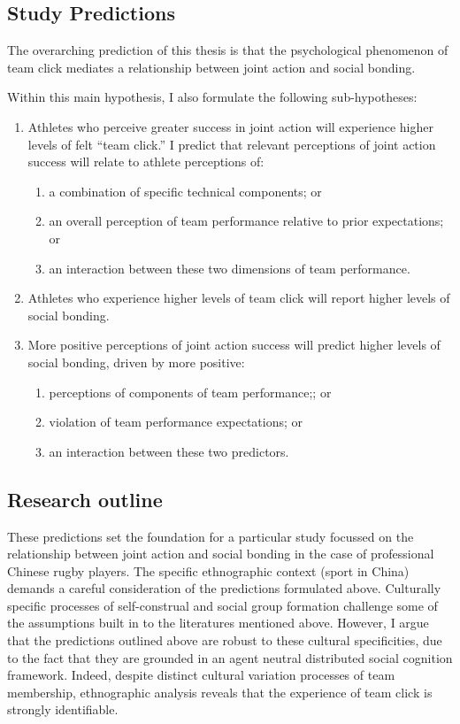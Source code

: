 \begin{CJK}{UTF8}{gbsn}
\subsection{Study Predictions}


    The overarching prediction of this thesis is that the psychological phenomenon of team click mediates a relationship between joint action and social bonding.

    Within this main hypothesis, I also formulate the following sub-hypotheses:
    \begin{enumerate}
      \item Athletes who perceive greater success in joint action will experience higher levels of felt ``team click.'' I predict that relevant perceptions of joint action success will relate to athlete perceptions of:
        \begin{enumerate}
          \item a combination of specific technical components; or
          \item an overall perception of team performance relative to prior expectations; or
          \item an interaction between these two dimensions of team performance.
        \end{enumerate}
      \item Athletes who experience higher levels of team click will report higher levels of social bonding.
      \item More positive perceptions of joint action success will predict higher levels of social bonding, driven by more positive:
      \begin{enumerate}
        \item perceptions of components of team performance;; or
        \item violation of team performance expectations; or
        \item an interaction between these two predictors.
      \end{enumerate}
    \end{enumerate}


\subsection{Research outline}

These predictions set the foundation for a particular study focussed on the relationship between joint action and social bonding in the case of professional Chinese rugby players. The specific ethnographic context (sport in China) demands a careful consideration of the predictions formulated above.  Culturally specific processes of self-construal and social group formation challenge some of the assumptions built in to the literatures mentioned above.  However, I argue that the predictions outlined above are robust to these cultural specificities, due to the fact that they are grounded in an agent neutral distributed social cognition framework. Indeed, despite distinct cultural variation processes of team membership, ethnographic analysis reveals that the experience of team click is strongly identifiable.


\end{CJK}
